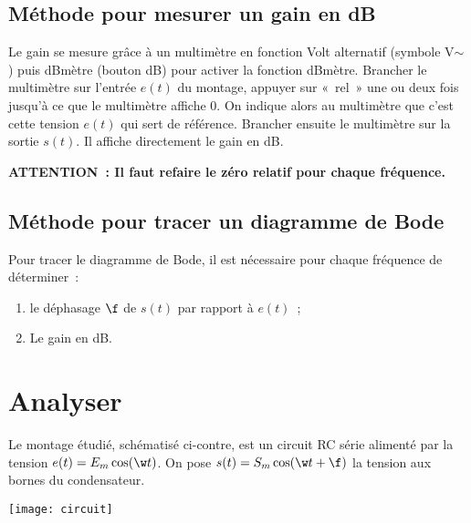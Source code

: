 \documentclass[a4paper, 11pt, final, garamond]{book}
\begin{document}
\subsection{Méthode pour mesurer un gain en dB}

Le gain se mesure grâce à un multimètre en fonction Volt alternatif (symbole
V$\sim$) puis dBmètre (bouton dB) pour activer la fonction dBmètre. Brancher le
multimètre sur l'entrée $e(t)$ du montage, appuyer sur «~rel~» une ou deux fois
jusqu'à ce que le multimètre affiche 0. On indique alors au multimètre que c'est
cette tension $e(t)$ qui sert de référence. Brancher ensuite le multimètre sur
la sortie $s(t)$. Il affiche directement le gain en dB.

\begin{brapp}{}
    \centering
    \textbf{ATTENTION~: Il faut refaire le zéro relatif pour chaque fréquence.}
\end{brapp}


\subsection{Méthode pour tracer un diagramme de Bode}

Pour tracer le diagramme de Bode, il est nécessaire pour chaque fréquence de
déterminer~:
\begin{enumerate}
    \item le déphasage $\f$ de $s(t)$ par rapport à $e(t)$~;
    \item Le gain en dB.
\end{enumerate}

\section{Analyser}

\begin{minipage}{0.60\linewidth}
    Le montage étudié, schématisé ci-contre, est un circuit RC série alimenté
    par la tension $e(t) = E_{m} \cos(\w t)$. On pose $s(t) = S_{m} \cos (\w t +
    \f)$ la tension aux bornes du condensateur.
\end{minipage}
\hfill
\begin{minipage}{0.35\linewidth}
    \begin{center}
        \texttt{[image: circuit]}
    \end{center}
\end{minipage}
\end{document}
